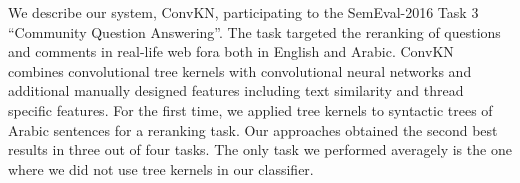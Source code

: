 We describe our system, ConvKN, participating to the SemEval-2016 Task 3 ``Community Question Answering''. The task targeted the reranking of questions and comments in real-life web fora both in English and Arabic. ConvKN combines convolutional tree kernels with convolutional neural networks and additional manually designed features including text similarity and thread specific features. For the first time, we applied tree kernels to syntactic trees of Arabic sentences for a reranking task. Our approaches obtained the second best results in three out of four tasks. The only task we performed averagely is the one where we did not use tree kernels in our classifier.
